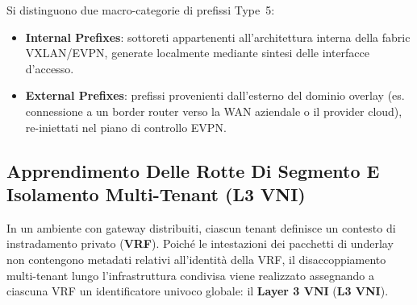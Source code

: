 \documentclass[11pt, a4paper]{article}
\begin{document}

Si distinguono due macro-categorie di prefissi Type~5:
\begin{itemize}[noitemsep]
    \item \textbf{Internal Prefixes}: sottoreti appartenenti all'architettura interna della fabric VXLAN/EVPN, generate localmente mediante sintesi delle interfacce d'accesso.
    \item \textbf{External Prefixes}: prefissi provenienti dall'esterno del dominio overlay (es. connessione a un border router verso la WAN aziendale o il provider cloud), re-iniettati nel piano di controllo EVPN.
\end{itemize}

\subsection{Apprendimento Delle Rotte Di Segmento E Isolamento Multi-Tenant (L3 VNI)}

In un ambiente con gateway distribuiti, ciascun tenant definisce un contesto di instradamento privato (\textbf{VRF}). Poiché le intestazioni dei pacchetti di underlay non contengono metadati relativi all'identità della VRF, il disaccoppiamento multi-tenant lungo l'infrastruttura condivisa viene realizzato assegnando a ciascuna VRF un identificatore univoco globale: il \textbf{Layer 3 VNI} (\textbf{L3 VNI}).

\end{document}
